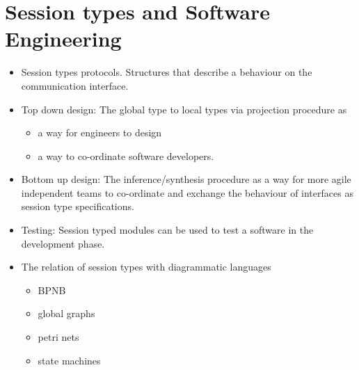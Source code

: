 \section{Session types and Software Engineering}

\begin{itemize}
	\item	Session types protocols. Structures that describe
			a behaviour on the communication interface.

	\item	Top down design: The global type to local types via projection procedure as
			\begin{itemize}
				\item	a way for engineers to design
				\item	a way to co-ordinate software developers.
			\end{itemize}

	\item	Bottom up design: The inference/synthesis procedure as
			a way for more agile independent teams to co-ordinate and
			exchange the behaviour of interfaces as session type
			specifications.

	\item	Testing: Session typed modules can be used to test
			a software in the development phase.

	\item	The relation of session types with diagrammatic languages
			\begin{itemize}
				\item	BPNB \cite{citation_needed}
				\item	global graphs\cite{citation_needed}
				\item	petri nets\cite{citation_needed}
				\item	state machines \cite{citation_needed}
			\end{itemize}
\end{itemize}
